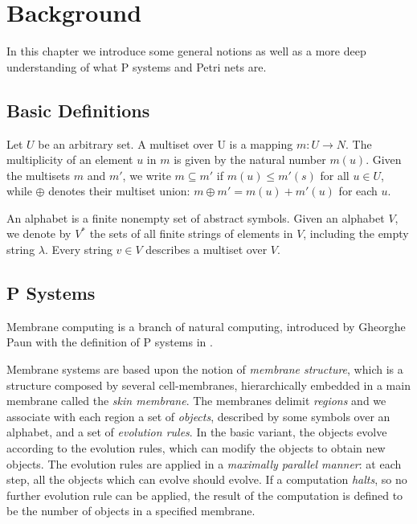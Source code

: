 \chapter{Background}

In this chapter we introduce some general notions as well as a more deep understanding of what P systems and Petri nets are.

\section{Basic Definitions}

\begin{definition}[Multiset]
Let $U$ be an arbitrary set. A multiset over U is a mapping \newline $m : U \rightarrow N$.
The multiplicity of an element $u$ in $m$ is given by the natural number $m(u)$.
Given the multisets $m$ and $m'$, we write $m \subseteq m'$ if $m(u) \leq m'(s)$ for all $u \in U$, 
while $\oplus$ denotes their multiset union: $m \oplus m' = m(u) + m'(u)$ for each $u$.

\end{definition}


\begin{definition}[Alphabet]
An alphabet is a finite nonempty set of abstract symbols. Given an alphabet $V$, we denote by $V^*$
the sets of all finite strings of elements in $V$, including the empty string $\lambda$.
Every string $v \in V$ describes a multiset over $V$.
\end{definition}

\section{P Systems}

Membrane computing is a branch of natural computing, introduced by Gheorghe Paun with the definition of P systems in \cite{puaun2000computing,puaun2002membrane,paun1999computing}.

Membrane systems are based upon the notion of \textit{membrane structure}, which is a structure composed by several cell-membranes, hierarchically embedded in a main membrane called the \textit{skin membrane}.
The membranes delimit \textit{regions} and we associate with each region a set of \textit{objects}, described by some symbols over an alphabet, and a set of \textit{evolution rules}.
In the basic variant, the objects evolve according to the evolution rules, which can modify the objects to obtain new objects.
The evolution rules are applied in a \textit{maximally parallel manner}: at each step, all the objects which can evolve should evolve.
If a computation \textit{halts}, so no further evolution rule can be applied, the result of the computation is defined to be the number of objects in a specified membrane.

